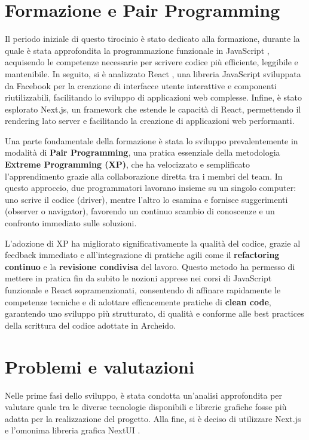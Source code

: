 \documentclass[target=bach,aauheader=,style=]{thud}
\begin{document}
\section{Formazione e Pair Programming}
Il periodo iniziale di questo tirocinio è stato dedicato alla formazione, durante la quale è stata approfondita la programmazione funzionale in JavaScript \cite{knowthen2024}, acquisendo le competenze necessarie per scrivere codice più efficiente, leggibile e mantenibile. In seguito, si è analizzato React \cite{udemyreactredux2024}, una libreria JavaScript sviluppata da Facebook per la creazione di interfacce utente interattive e componenti riutilizzabili, facilitando lo sviluppo di applicazioni web complesse. Infine, è stato esplorato Next.js, un framework che estende le capacità di React, permettendo il rendering lato server e facilitando la creazione di applicazioni web performanti.

\noindent Una parte fondamentale della formazione è stata lo sviluppo prevalentemente in modalità di \textbf{Pair Programming}, una pratica essenziale della metodologia \textbf{Extreme Programming (XP)}, che ha velocizzato e semplificato l'apprendimento grazie alla collaborazione diretta tra i membri del team. In questo approccio, due programmatori lavorano insieme su un singolo computer: uno scrive il codice (driver), mentre l'altro lo esamina e fornisce suggerimenti (observer o navigator), favorendo un continuo scambio di conoscenze e un confronto immediato sulle soluzioni.

\noindent L'adozione di XP ha migliorato significativamente la qualità del codice, grazie al feedback immediato e all'integrazione di pratiche agili come il \textbf{refactoring continuo} e la \textbf{revisione condivisa} del lavoro. Questo metodo ha permesso di mettere in pratica fin da subito le nozioni apprese nei corsi di JavaScript funzionale e React sopramenzionati, consentendo di affinare rapidamente le competenze tecniche e di adottare efficacemente pratiche di \textbf{clean code}, garantendo uno sviluppo più strutturato, di qualità e conforme alle best practices della scrittura del codice adottate in Archeido.

\section{Problemi e valutazioni}
Nelle prime fasi dello sviluppo, è stata condotta un'analisi approfondita per valutare quale tra le diverse tecnologie disponibili e librerie grafiche fosse più adatta per la realizzazione del progetto. Alla fine, si è deciso di utilizzare Next.js \cite{nextjs2024} e l'omonima libreria grafica NextUI \cite{nextui2024}. 
\end{document}
